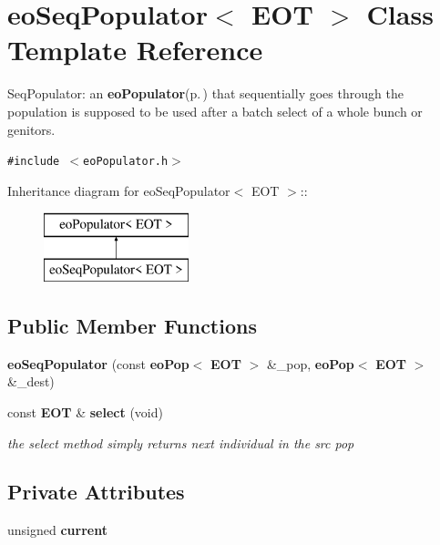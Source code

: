 \section{eo\-Seq\-Populator$<$ EOT $>$ Class Template Reference}
\label{classeo_seq_populator}
Seq\-Populator: an {\bf eo\-Populator}{\rm (p.\,\pageref{classeo_populator})} that sequentially goes through the population is supposed to be used after a batch select of a whole bunch or genitors.  


{\tt \#include $<$eo\-Populator.h$>$}

Inheritance diagram for eo\-Seq\-Populator$<$ EOT $>$::\begin{figure}[H]
\begin{center}
\leavevmode
\includegraphics[height=2cm]{classeo_seq_populator}
\end{center}
\end{figure}
\subsection*{Public Member Functions}
\begin{CompactItemize}
\item 
{\bf eo\-Seq\-Populator} (const {\bf eo\-Pop}$<$ {\bf EOT} $>$ \&\_\-pop, {\bf eo\-Pop}$<$ {\bf EOT} $>$ \&\_\-dest)\label{classeo_seq_populator_a0}

\item 
const {\bf EOT} \& {\bf select} (void)\label{classeo_seq_populator_a1}

\begin{CompactList}\small\item\em the select method simply returns next individual in the src pop \item\end{CompactList}\end{CompactItemize}
\subsection*{Private Attributes}
\begin{CompactItemize}
\item 
unsigned {\bf current}\label{classeo_seq_populator_r0}

\end{CompactItemize}


